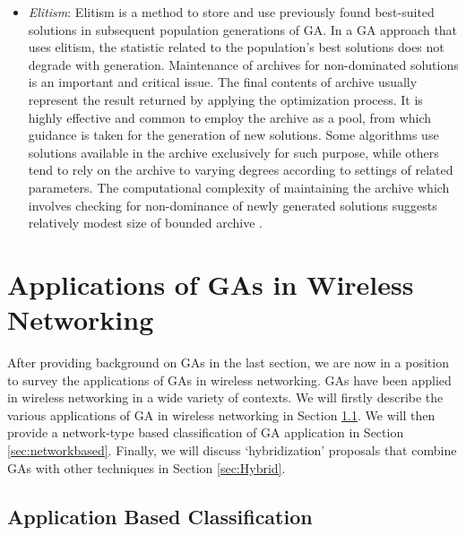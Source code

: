 \documentclass[journal]{IEEEtran}
\begin{document}
\begin{itemize}
\vspace{1mm}
\item \emph{Elitism}: Elitism is a method to store and use previously found best-suited solutions in subsequent population generations of GA. In a GA approach that uses elitism, the statistic related to the population's best solutions does not degrade with generation. Maintenance of archives for non-dominated solutions is an important and critical issue. The final contents of archive usually represent the result returned by applying the optimization process. It is highly effective and common to employ the archive as a pool, from which guidance is taken for the generation of new solutions. Some algorithms use solutions available in the archive exclusively for such purpose, while others tend to rely on the archive to varying degrees according to settings of related parameters. The computational complexity of maintaining the archive which involves checking for non-dominance of newly generated solutions suggests relatively modest size of bounded archive \cite{knowles2004bounded}. 

\end{itemize}

\section{Applications of GAs in Wireless Networking}
\label{sec:applications}

After providing background on GAs in the last section, we are now in a position to survey the applications of GAs in wireless networking. GAs have been applied in wireless networking in a wide variety of contexts. We will firstly describe the various applications of GA in wireless networking in Section \ref{sec:appbased}. We will then provide a network-type based classification of GA application in Section \ref{sec:networkbased}. Finally, we will discuss `hybridization' proposals that combine GAs with other techniques in Section \ref{sec:Hybrid}.

\subsection{\textbf{Application Based Classification}}
\label{sec:appbased}
\end{document}
